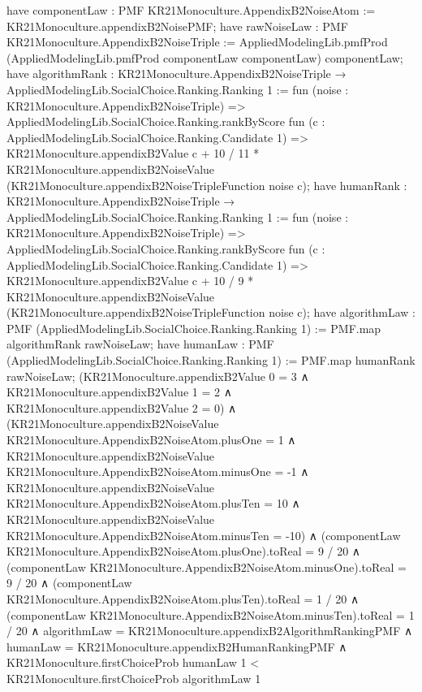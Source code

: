\documentclass[10pt]{article}
\begin{document}
\begin{ReviewVerbatim}
have componentLaw : PMF KR21Monoculture.AppendixB2NoiseAtom := KR21Monoculture.appendixB2NoisePMF;
have rawNoiseLaw : PMF KR21Monoculture.AppendixB2NoiseTriple :=
  AppliedModelingLib.pmfProd (AppliedModelingLib.pmfProd componentLaw componentLaw) componentLaw;
have algorithmRank : KR21Monoculture.AppendixB2NoiseTriple → AppliedModelingLib.SocialChoice.Ranking.Ranking 1 :=
  fun (noise : KR21Monoculture.AppendixB2NoiseTriple) =>
  AppliedModelingLib.SocialChoice.Ranking.rankByScore fun (c : AppliedModelingLib.SocialChoice.Ranking.Candidate 1) =>
    KR21Monoculture.appendixB2Value c +
      10 / 11 * KR21Monoculture.appendixB2NoiseValue (KR21Monoculture.appendixB2NoiseTripleFunction noise c);
have humanRank : KR21Monoculture.AppendixB2NoiseTriple → AppliedModelingLib.SocialChoice.Ranking.Ranking 1 :=
  fun (noise : KR21Monoculture.AppendixB2NoiseTriple) =>
  AppliedModelingLib.SocialChoice.Ranking.rankByScore fun (c : AppliedModelingLib.SocialChoice.Ranking.Candidate 1) =>
    KR21Monoculture.appendixB2Value c +
      10 / 9 * KR21Monoculture.appendixB2NoiseValue (KR21Monoculture.appendixB2NoiseTripleFunction noise c);
have algorithmLaw : PMF (AppliedModelingLib.SocialChoice.Ranking.Ranking 1) := PMF.map algorithmRank rawNoiseLaw;
have humanLaw : PMF (AppliedModelingLib.SocialChoice.Ranking.Ranking 1) := PMF.map humanRank rawNoiseLaw;
(KR21Monoculture.appendixB2Value 0 = 3 ∧
    KR21Monoculture.appendixB2Value 1 = 2 ∧ KR21Monoculture.appendixB2Value 2 = 0) ∧
  (KR21Monoculture.appendixB2NoiseValue KR21Monoculture.AppendixB2NoiseAtom.plusOne = 1 ∧
      KR21Monoculture.appendixB2NoiseValue KR21Monoculture.AppendixB2NoiseAtom.minusOne = -1 ∧
        KR21Monoculture.appendixB2NoiseValue KR21Monoculture.AppendixB2NoiseAtom.plusTen = 10 ∧
          KR21Monoculture.appendixB2NoiseValue KR21Monoculture.AppendixB2NoiseAtom.minusTen = -10) ∧
    (componentLaw KR21Monoculture.AppendixB2NoiseAtom.plusOne).toReal = 9 / 20 ∧
      (componentLaw KR21Monoculture.AppendixB2NoiseAtom.minusOne).toReal = 9 / 20 ∧
        (componentLaw KR21Monoculture.AppendixB2NoiseAtom.plusTen).toReal = 1 / 20 ∧
          (componentLaw KR21Monoculture.AppendixB2NoiseAtom.minusTen).toReal = 1 / 20 ∧
            algorithmLaw = KR21Monoculture.appendixB2AlgorithmRankingPMF ∧
              humanLaw = KR21Monoculture.appendixB2HumanRankingPMF ∧
                KR21Monoculture.firstChoiceProb humanLaw 1 < KR21Monoculture.firstChoiceProb algorithmLaw 1
\end{ReviewVerbatim}
\end{document}
